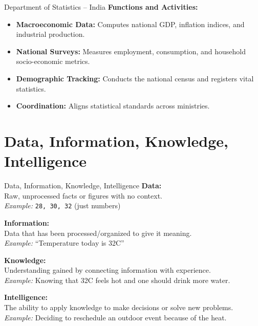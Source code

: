 \documentclass{beamer}
\begin{document}
\begin{frame}{Department of Statistics -- India}
\textbf{Functions and Activities:}
\begin{itemize}
    \item \textbf{Macroeconomic Data:} Computes national GDP, inflation indices, and industrial production.
    \item \textbf{National Surveys:} Measures employment, consumption, and household socio-economic metrics.
    \item \textbf{Demographic Tracking:} Conducts the national census and registers vital statistics.
    \item \textbf{Coordination:} Aligns statistical standards across ministries.
\end{itemize}
\end{frame}

\section{Data, Information, Knowledge, Intelligence}

\begin{frame}{Data, Information, Knowledge, Intelligence}
\textbf{Data:}\\[0.5mm]
Raw, unprocessed facts or figures with no context.\\
\textit{Example:} \texttt{28, 30, 32} (just numbers)

\vspace{1.5mm}
\textbf{Information:}\\[0.5mm]
Data that has been processed/organized to give it meaning.\\
\textit{Example:} ``Temperature today is 32\textdegree C''

\vspace{1.5mm}
\textbf{Knowledge:}\\[0.5mm]
Understanding gained by connecting information with experience.\\
\textit{Example:} Knowing that 32\textdegree C feels hot and one should drink more water.

\vspace{1.5mm}
\textbf{Intelligence:}\\[0.5mm]
The ability to apply knowledge to make decisions or solve new problems.\\
\textit{Example:} Deciding to reschedule an outdoor event because of the heat.
\vspace{1.5mm}
\end{frame}
\end{document}
